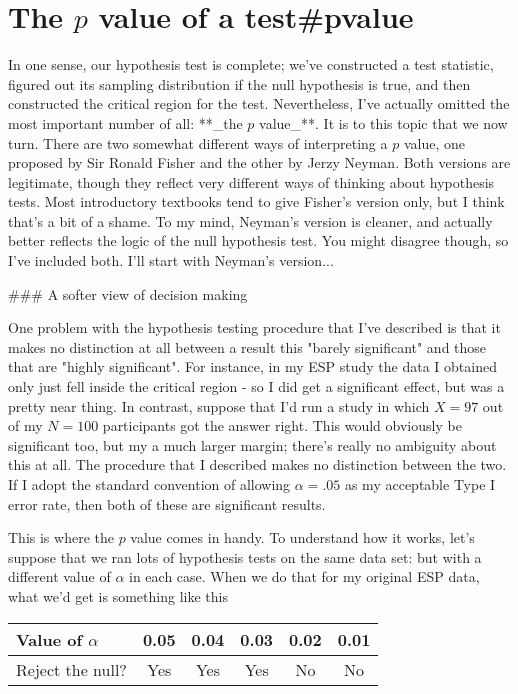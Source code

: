 \section{The $p$ value of a test{#pvalue}}

In one sense, our hypothesis test is complete; we've constructed a test statistic, figured out its sampling distribution if the null hypothesis is true, and then constructed the critical region for the test. Nevertheless, I've actually omitted the most important number of all: **_the $p$ value_**. It is to this topic that we now turn. There are two somewhat different ways of interpreting a $p$ value, one proposed by Sir Ronald Fisher and the other by Jerzy Neyman. Both versions are legitimate, though they reflect very different ways of thinking about hypothesis tests. Most introductory textbooks tend to give Fisher's version only, but I think that's a bit of a shame. To my mind, Neyman's version is cleaner, and actually better reflects the logic of the null hypothesis test. You might disagree though, so I've included both. I'll start with Neyman's version...


### A softer view of decision making

One problem with the hypothesis testing procedure that I've described is that it makes no distinction at all between a result this "barely significant" and those that are "highly significant". For instance, in my ESP study the data I obtained only just fell inside the critical region - so I did get a significant effect, but was a pretty near thing. In contrast, suppose that I'd run a study in which $X=97$ out of my $N=100$ participants got the answer right. This would obviously be significant too, but my a much larger margin; there's really no ambiguity about this at all. The procedure that I described makes no distinction between the two. If I adopt the standard convention of allowing $\alpha = .05$ as my acceptable Type I error rate, then both of these are significant results. 

This is where the $p$ value comes in handy. To understand how it works, let's suppose that we ran lots of hypothesis tests on the same data set: but with a different value of $\alpha$ in each case. When we do that for my original ESP data, what we'd get is something like this

\begin{center}
\begin{tabular}{l|ccccc}
Value of $\alpha$ & 0.05 & 0.04 & 0.03 & 0.02 & 0.01 \\ \hline
Reject the null?  & Yes & Yes & Yes & No & No \\
\end{tabular}
\end{center}


